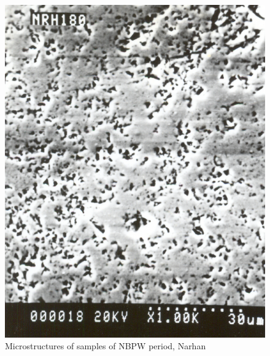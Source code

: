 \begin{figure}[H]
\renewcommand{\thefigure}{26C}
\includegraphics[scale=0.6]{images/chapter-4/fig026C.jpg}
\caption{Microstructures of samples of NBPW period, Narhan}\label{chapter-4-fig26C}
\end{figure}


